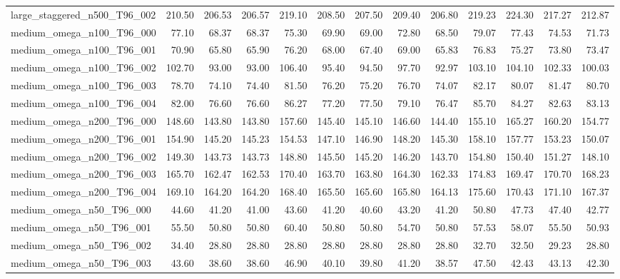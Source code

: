 \begin{table}[htbp]
\begin{tabular}{lrrrrrrrrrrrr}
large\_staggered\_n500\_T96\_002 & 210.50 & 206.53 & 206.57 & 219.10 & 208.50 & 207.50 & 209.40 & 206.80 & 219.23 & 224.30 & 217.27 & 212.87 \\
medium\_omega\_n100\_T96\_000 & 77.10 & 68.37 & 68.37 & 75.30 & 69.90 & 69.00 & 72.80 & 68.50 & 79.07 & 77.43 & 74.53 & 71.73 \\
medium\_omega\_n100\_T96\_001 & 70.90 & 65.80 & 65.90 & 76.20 & 68.00 & 67.40 & 69.00 & 65.83 & 76.83 & 75.27 & 73.80 & 73.47 \\
medium\_omega\_n100\_T96\_002 & 102.70 & 93.00 & 93.00 & 106.40 & 95.40 & 94.50 & 97.70 & 92.97 & 103.10 & 104.10 & 102.33 & 100.03 \\
medium\_omega\_n100\_T96\_003 & 78.70 & 74.10 & 74.40 & 81.50 & 76.20 & 75.20 & 76.70 & 74.07 & 82.17 & 80.07 & 81.47 & 80.70 \\
medium\_omega\_n100\_T96\_004 & 82.00 & 76.60 & 76.60 & 86.27 & 77.20 & 77.50 & 79.10 & 76.47 & 85.70 & 84.27 & 82.63 & 83.13 \\
medium\_omega\_n200\_T96\_000 & 148.60 & 143.80 & 143.80 & 157.60 & 145.40 & 145.10 & 146.60 & 144.40 & 155.10 & 165.27 & 160.20 & 154.77 \\
medium\_omega\_n200\_T96\_001 & 154.90 & 145.20 & 145.23 & 154.53 & 147.10 & 146.90 & 148.20 & 145.30 & 158.10 & 157.77 & 153.23 & 150.07 \\
medium\_omega\_n200\_T96\_002 & 149.30 & 143.73 & 143.73 & 148.80 & 145.50 & 145.20 & 146.20 & 143.70 & 154.80 & 150.40 & 151.27 & 148.10 \\
medium\_omega\_n200\_T96\_003 & 165.70 & 162.47 & 162.53 & 170.40 & 163.70 & 163.80 & 164.30 & 162.33 & 174.83 & 169.47 & 170.70 & 168.23 \\
medium\_omega\_n200\_T96\_004 & 169.10 & 164.20 & 164.20 & 168.40 & 165.50 & 165.60 & 165.80 & 164.13 & 175.60 & 170.43 & 171.10 & 167.37 \\
medium\_omega\_n50\_T96\_000 & 44.60 & 41.20 & 41.00 & 43.60 & 41.20 & 40.60 & 43.20 & 41.20 & 50.80 & 47.73 & 47.40 & 42.77 \\
medium\_omega\_n50\_T96\_001 & 55.50 & 50.80 & 50.80 & 60.40 & 50.80 & 50.80 & 54.70 & 50.80 & 57.53 & 58.07 & 55.50 & 50.93 \\
medium\_omega\_n50\_T96\_002 & 34.40 & 28.80 & 28.80 & 28.80 & 28.80 & 28.80 & 28.80 & 28.80 & 32.70 & 32.50 & 29.23 & 28.80 \\
medium\_omega\_n50\_T96\_003 & 43.60 & 38.60 & 38.60 & 46.90 & 40.10 & 39.80 & 41.20 & 38.57 & 47.50 & 42.43 & 43.13 & 42.30 \\

\end{tabular}
\end{table}
